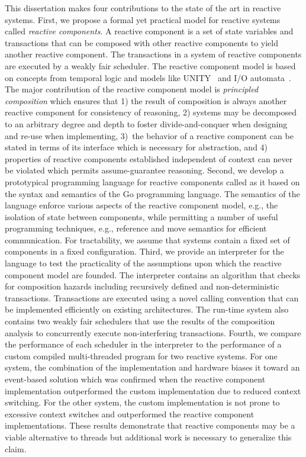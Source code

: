This dissertation makes four contributions to the state of the art in reactive systems.
First, we propose a formal yet practical model for reactive systems called \emph{reactive components}.
A reactive component is a set of state variables and transactions that can be composed with other reactive components to yield another reactive component.
The transactions in a system of reactive components are executed by a weakly fair scheduler.
The reactive component model is based on concepts from temporal logic and models like UNITY~\cite{chandy1989parallel} and I/O automata~\cite{nancy1996distributed}.
The major contribution of the reactive component model is \emph{principled composition} which ensures that 1) the result of composition is always another reactive component for consistency of reasoning, 2) systems may be decomposed to an arbitrary degree and depth to foster divide-and-conquer when designing and re-use when implementing, 3)~the behavior of a reactive component can be stated in terms of its interface which is necessary for abstraction, and 4) properties of reactive components established independent of context can never be violated which permits assume-guarantee reasoning.
Second, we develop a prototypical programming language for reactive components called \rcgo as it based on the syntax and semantics of the Go programming language.
The semantics of the language enforce various aspects of the reactive component model, e.g., the isolation of state between components, while permitting a number of useful programming techniques, e.g., reference and move semantics for efficient communication.
For tractability, we assume that systems contain a fixed set of components in a fixed configuration.
Third, we provide an interpreter for the \rcgo language to test the practicality of the assumptions upon which the reactive component model are founded.
The interpreter contains an algorithm that checks for composition hazards including recursively defined and non-deterministic transactions.
Transactions are executed using a novel calling convention that can be implemented efficiently on existing architectures.
The run-time system also contains two weakly fair schedulers that use the results of the composition analysis to concurrently execute non-interfering transactions.
Fourth, we compare the performance of each scheduler in the interpreter to the performance of a custom compiled multi-threaded program for two reactive systems.
For one system, the combination of the implementation and hardware biases it toward an event-based solution which was confirmed when the reactive component implementation outperformed the custom implementation due to reduced context switching.
For the other system, the custom implementation is not prone to excessive context switches and outperformed the reactive component implementations.
These results demonstrate that reactive components may be a viable alternative to threads but additional work is necessary to generalize this claim.
